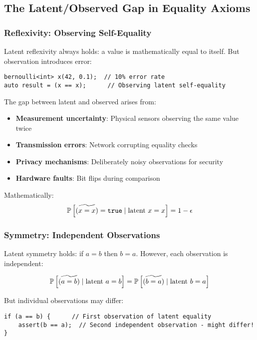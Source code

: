 \documentclass[11pt,final,hidelinks]{article}
\begin{document}
\subsection{The Latent/Observed Gap in Equality Axioms}

\subsubsection{Reflexivity: Observing Self-Equality}

Latent reflexivity always holds: a value is mathematically equal to itself. But observation introduces error:

\begin{verbatim}
bernoulli<int> x(42, 0.1);  // 10% error rate
auto result = (x == x);      // Observing latent self-equality
\end{verbatim}

The gap between latent and observed arises from:
\begin{itemize}
    \item \textbf{Measurement uncertainty}: Physical sensors observing the same value twice
    \item \textbf{Transmission errors}: Network corrupting equality checks
    \item \textbf{Privacy mechanisms}: Deliberately noisy observations for security
    \item \textbf{Hardware faults}: Bit flips during comparison
\end{itemize}

Mathematically:
\begin{equation}
\mathbb{P}\left[\widetilde{(x = x)} = \mathtt{true} \mid \text{latent } x = x\right] = 1 - \epsilon
\end{equation}

\subsubsection{Symmetry: Independent Observations}

Latent symmetry holds: if $a = b$ then $b = a$. However, each observation is independent:

\begin{equation}
\mathbb{P}\left[\widetilde{(a = b)} \mid \text{latent } a = b\right] = \mathbb{P}\left[\widetilde{(b = a)} \mid \text{latent } b = a\right]
\end{equation}

But individual observations may differ:
\begin{verbatim}
if (a == b) {      // First observation of latent equality
    assert(b == a);  // Second independent observation - might differ!
}
\end{verbatim}
\end{document}
